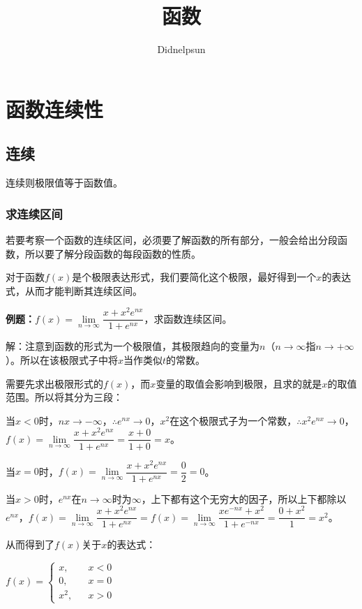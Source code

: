 \documentclass[UTF8, 12pt]{ctexart}
\author{Didnelpsun}
\title{函数}
\date{}
\begin{document}
\maketitle
\pagestyle{empty}
\thispagestyle{empty}
\tableofcontents
\thispagestyle{empty}
\newpage
\pagestyle{plain}
\setcounter{page}{1}
\section{函数连续性}

\subsection{连续}

连续则极限值等于函数值。

\subsubsection{求连续区间}

若要考察一个函数的连续区间，必须要了解函数的所有部分，一般会给出分段函数，所以要了解分段函数的每段函数的性质。

对于函数$f(x)$是个极限表达形式，我们要简化这个极限，最好得到一个$x$的表达式，从而才能判断其连续区间。\medskip

\textbf{例题：}$f(x)=\lim\limits_{n\to\infty}\dfrac{x+x^2e^{nx}}{1+e^{nx}}$，求函数连续区间。\medskip

解：注意到函数的形式为一个极限值，其极限趋向的变量为$n$（$n\to\infty$指$n\to+\infty$）。所以在该极限式子中将$x$当作类似$t$的常数。

需要先求出极限形式的$f(x)$，而$x$变量的取值会影响到极限，且求的就是$x$的取值范围。所以将其分为三段：

当$x<0$时，$nx\to-\infty$，$\therefore e^{nx}\to 0$，$x^2$在这个极限式子为一个常数，$\therefore x^2e^{nx}\to 0$，$f(x)=\lim\limits_{n\to\infty}\dfrac{x+x^2e^{nx}}{1+e^{nx}}=\dfrac{x+0}{1+0}=x$。\medskip

当$x=0$时，$f(x)=\lim\limits_{n\to\infty}\dfrac{x+x^2e^{nx}}{1+e^{nx}}=\dfrac{0}{2}=0$。\medskip

当$x>0$时，$e^{nx}$在$n\to\infty$时为$\infty$，上下都有这个无穷大的因子，所以上下都除以$e^{nx}$，$f(x)=\lim\limits_{n\to\infty}\dfrac{x+x^2e^{nx}}{1+e^{nx}}=f(x)=\lim\limits_{n\to\infty}\dfrac{xe^{-nx}+x^2}{1+e^{-nx}}=\dfrac{0+x^2}{1}=x^2$。\medskip

从而得到了$f(x)$关于$x$的表达式：\medskip

$f(x)=\left\{\begin{array}{lcl}
        x,   &  & x<0 \\
        0,   &  & x=0 \\
        x^2, &  & x>0
    \end{array}
    \right.$\medskip
\end{document}
